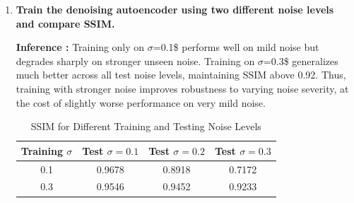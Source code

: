 \documentclass[10pt]{article}
\begin{document}
\begin{enumerate}
\begin{table}[htbp]
\centering
\caption{Gaussian vs. Salt-and-Pepper Noise: Metrics Against Clean Images}
\end{table}

\item \textbf{Train the denoising autoencoder using two different noise
levels and compare SSIM.} 


\textbf{Inference :} Training only on $\sigma$=0.1\$ performs well on mild noise but degrades sharply on stronger unseen noise. Training on $\sigma$=0.3\$ generalizes much better across all test noise levels, maintaining SSIM above 0.92. Thus, training with stronger noise improves robustness to varying noise severity, at the cost of slightly worse performance on very mild noise. 

\begin{table}[htbp]
\centering
\caption{SSIM for Different Training and Testing Noise Levels}
\begin{tabular}{c c c c}
\hline
\textbf{Training $\sigma$} & \textbf{Test $\sigma=0.1$} & \textbf{Test $\sigma=0.2$} & \textbf{Test $\sigma=0.3$} \\
\hline
0.1 & 0.9678 & 0.8918 & 0.7172 \\
0.3 & 0.9546 & 0.9452 & 0.9233 \\
\hline
\end{tabular}
\end{table}


\end{enumerate}
\end{document}
